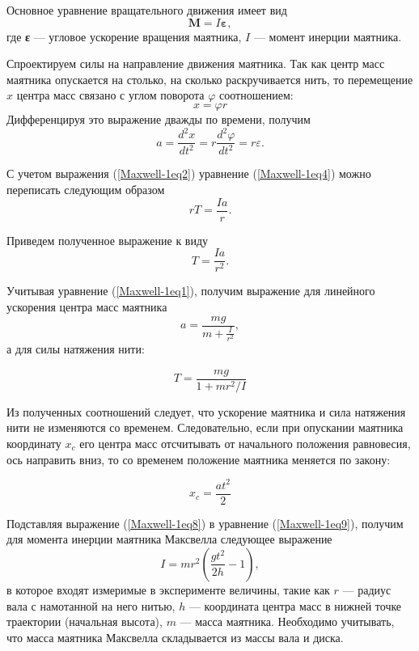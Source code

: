 \documentclass[14pt,a4paper,oneside]{extarticle}	%
\begin{document}
	Основное уравнение вращательного движения имеет вид
	\begin{equation}\label{Maxwell-1eq2}
	\textbf{M} = I\textbf{ε},
	\end{equation}
	где \textbf{ε} — угловое ускорение вращения маятника, $ I $ — момент инерции маятника.
	
	Спроектируем силы на направление движения маятника.  
	Так как центр масс маятника опускается на столько, на сколько раскручивается нить, то перемещение $ x $ центра масс связано с углом поворота $ \varphi $ соотношением:
	\begin{equation}\label{Maxwell-1eq3}
	x = \varphi r
	\end{equation}
	Дифференцируя это выражение дважды по времени, получим
	\begin{equation}\label{Maxwell-1eq4}
	a = \frac{d^{2} x}{d t^{2}} = r\frac{d^{2} \varphi}{d t^{2}} = r \varepsilon.
	\end{equation}
	
	С учетом выражения (\ref{Maxwell-1eq2}) уравнение (\ref{Maxwell-1eq4}) можно переписать следующим образом 
	\begin{equation}\label{Maxwell-1eq5}
	rT = \frac{Ia}{r}.
	\end{equation}
	
	Приведем полученное выражение к виду
	\begin{equation}\label{Maxwell-1eq6}
	T = \frac{Ia}{r^{2}}.
	\end{equation}
	
	Учитывая уравнение (\ref{Maxwell-1eq1}), получим выражение для линейного ускорения центра масс маятника
	\begin{equation}\label{Maxwell-1eq7}
	a = \frac{mg}{m + \frac{I}{r^{2}}},
	\end{equation}
	а для силы натяжения нити:
	
	\begin{equation}\label{Maxwell-1eq8}
	T = \frac{mg}{1 + mr^2/I}
	\end{equation}
	
	Из полученных соотношений следует, что ускорение маятника и сила натяжения нити не изменяются со временем. 
	Следовательно, если при опускании маятника координату $ x_c $ его центра масс отсчитывать от начального положения равновесия, ось направить вниз, то со временем положение маятника меняется по закону:
	
	\begin{equation}\label{Maxwell-1eq9}
	x_c = \frac{at^{2}}{2}
	\end{equation}
	
	Подставляя выражение (\ref{Maxwell-1eq8}) в уравнение (\ref{Maxwell-1eq9}), получим для момента инерции маятника Максвелла следующее выражение
	\begin{equation}\label{Maxwell-1eq10}
	I = mr^{2}\left(\frac{gt^{2}}{2h} - 1 \right),
	\end{equation}
	в которое входят измеримые в эксперименте величины, такие как $ r $ — радиус вала с намотанной на него нитью, $ h $ — координата центра масс в нижней точке траектории (начальная высота), $ m $ — масса маятника.
	Необходимо учитывать, что масса маятника Максвелла складывается из массы вала и диска.
	
	
\end{document}

